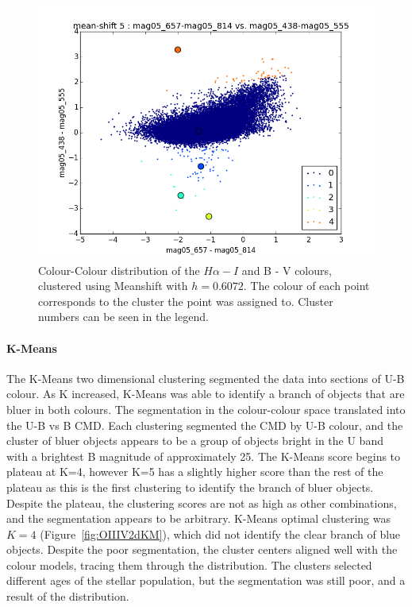 \begin{figure}
\centering
\includegraphics[width=\linewidth]{figs/unsuccessful/meanshift_color_5cl_mag05_657-mag05_814vsmag05_438-mag05_555}
\caption{Colour-Colour distribution of the $H\alpha - I$ and B - V colours, clustered using Meanshift with $h=0.6072$. The colour of each point corresponds to the cluster the point was assigned to. Cluster numbers can be seen in the legend.}
\label{fig:HAlphaI2dMS}
\end{figure}

\paragraph{K-Means}
The K-Means two dimensional clustering segmented the data into sections of U-B colour.
As K increased, K-Means was able to identify a branch of objects that are bluer in both colours.
The segmentation in the colour-colour space translated into the U-B vs B CMD. 
Each clustering segmented the CMD by U-B colour, and the cluster of bluer objects appears to be a group of objects bright in the U band with a brightest B magnitude of approximately 25.
The K-Means score begins to plateau at K=4, however K=5 has a slightly higher score than the rest of the plateau as this is the first clustering to identify the branch of bluer objects.
Despite the plateau, the clustering scores are not as high as other combinations, and the segmentation appears to be arbitrary.
K-Means optimal clustering was $K=4$ (Figure~\ref{fig:OIIIV2dKM}), which did not identify the clear branch of blue objects.
Despite the poor segmentation, the cluster centers aligned well with the colour models, tracing them through the distribution.
The clusters selected different ages of the stellar population, but the segmentation was still poor, and a result of the distribution. 

